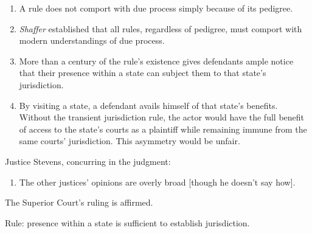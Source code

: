 \begin{enumerate}
\item
  A rule does not comport with due process simply because of its
  pedigree.
\item
  \emph{Shaffer} established that all rules, regardless of pedigree,
  must comport with modern understandings of due process.
\item
  More than a century of the rule's existence gives defendants ample
  notice that their presence within a state can subject them to that
  state's jurisdiction.
\item
  By visiting a state, a defendant avails himself of that state's
  benefits. Without the transient jurisdiction rule, the actor would
  have the full benefit of access to the state's courts as a plaintiff
  while remaining immune from the same courts' jurisdiction. This
  asymmetry would be unfair.
\end{enumerate}

Justice Stevens, concurring in the judgment:

\begin{enumerate}
\item
  The other justices' opinions are overly broad {[}though he doesn't say
  how{]}.
\end{enumerate}

The Superior Court's ruling is affirmed.

Rule: presence within a state is sufficient to establish jurisdiction.

